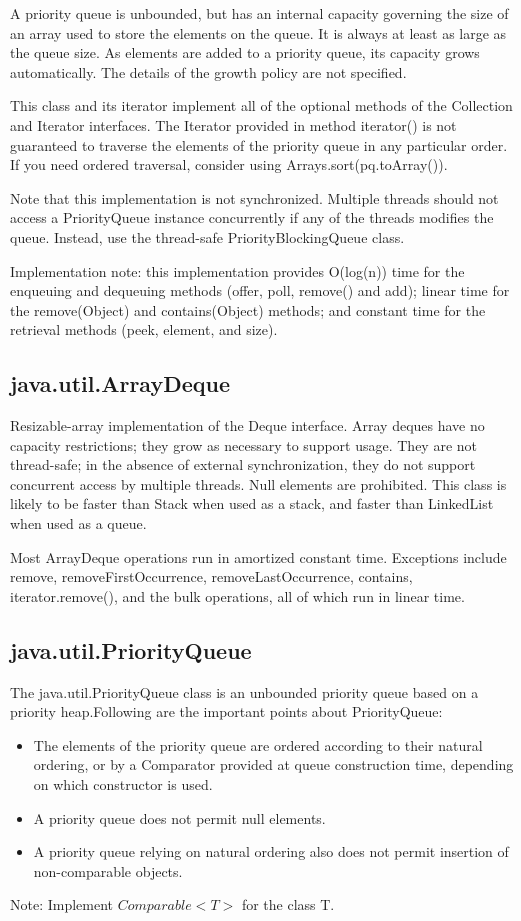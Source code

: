 \documentclass[a4paper]{article}
\begin{document}
A priority queue is unbounded, but has an internal capacity governing the size of an array used to store the elements on the queue. It is always at least as large as the queue size. As elements are added to a priority queue, its capacity grows automatically. The details of the growth policy are not specified.

This class and its iterator implement all of the optional methods of the Collection and Iterator interfaces. The Iterator provided in method iterator() is not guaranteed to traverse the elements of the priority queue in any particular order. If you need ordered traversal, consider using Arrays.sort(pq.toArray()).

Note that this implementation is not synchronized. Multiple threads should not access a PriorityQueue instance concurrently if any of the threads modifies the queue. Instead, use the thread-safe PriorityBlockingQueue class.

Implementation note: this implementation provides O(log(n)) time for the enqueuing and dequeuing methods (offer, poll, remove() and add); linear time for the remove(Object) and contains(Object) methods; and constant time for the retrieval methods (peek, element, and size).

\subsection{java.util.ArrayDeque}
Resizable-array implementation of the Deque interface. Array deques have no capacity restrictions; they grow as necessary to support usage. They are not thread-safe; in the absence of external synchronization, they do not support concurrent access by multiple threads. Null elements are prohibited. This class is likely to be faster than Stack when used as a stack, and faster than LinkedList when used as a queue.

Most ArrayDeque operations run in amortized constant time. Exceptions include remove, removeFirstOccurrence, removeLastOccurrence, contains, iterator.remove(), and the bulk operations, all of which run in linear time.

\subsection{java.util.PriorityQueue}
The java.util.PriorityQueue class is an unbounded priority queue based on a priority heap.Following are the important points about PriorityQueue:
\begin{itemize}
  \item The elements of the priority queue are ordered according to their natural ordering, or by a Comparator provided at queue construction time, depending on which constructor is used.
  \item A priority queue does not permit null elements.
  \item A priority queue relying on natural ordering also does not permit insertion of non-comparable objects.
\end{itemize}
Note: Implement \textit{$Comparable<T>$} for the class T.
\end{document}
